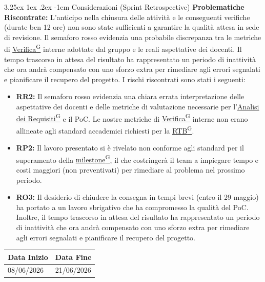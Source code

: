 \documentclass[a4paper,12pt]{article}
\makeatletter
\newcounter{subsubsubsection}[subsubsection]
\renewcommand\paragraph{\@startsection{paragraph}{5}{\z@}%
  {3.25ex \@plus1ex \@minus.2ex}%
  {-1em}%
  {\normalfont\normalsize\bfseries}}
\providecommand{\glslink}[2]{\href{https://alittlebyte-19.github.io/Documentazione/glossario.html\#gls-#1}{\underline{#2}\textsuperscript{\scriptsize G}}}
\makeatother
\begin{document}
\paragraph{Considerazioni (Sprint Retrospective)}
\textbf{Problematiche Riscontrate:} L'anticipo nella chiusura delle attività e le conseguenti verifiche (durate ben 12 ore) non sono state sufficienti a garantire la qualità attesa in sede di revisione. Il semaforo rosso evidenzia una probabile discrepanza tra le metriche di \glslink{verificatore}{Verifica} interne adottate dal gruppo e le reali aspettative dei docenti. Il tempo trascorso in attesa del risultato ha rappresentato un periodo di inattività che ora andrà compensato con uno sforzo extra per rimediare agli errori segnalati e pianificare il recupero del progetto.
I rischi riscontrati sono stati i seguenti:
\begin{itemize}
    \item \textbf{RR2:} Il semaforo rosso evidenzia una chiara errata interpretazione delle aspettative dei docenti e delle metriche di valutazione necessarie per l'\glslink{analisi-dei-requisiti-adr}{Analisi dei Requisiti} e il PoC. Le nostre metriche di \glslink{verificatore}{Verifica} interne non erano allineate agli standard accademici richiesti per la \glslink{rtb-requirements-and-technology-baseline}{RTB}.
    \item \textbf{RP2:} Il lavoro presentato si è rivelato non conforme agli standard per il superamento della \glslink{milestone}{milestone}, il che costringerà il team a impiegare tempo e costi maggiori (non preventivati) per rimediare al problema nel prossimo periodo.
    \item \textbf{RO3:} Il desiderio di chiudere la consegna in tempi brevi (entro il 29 maggio) ha portato a un lavoro sbrigativo che ha compromesso la qualità del PoC. Inoltre, il tempo trascorso in attesa del risultato ha rappresentato un periodo di inattività che ora andrà compensato con uno sforzo extra per rimediare agli errori segnalati e pianificare il recupero del progetto.
\end{itemize}


\label{sec:rtb_sestoperiodo}
\begin{table}[H]
    \centering
    \renewcommand{\arraystretch}{1.5} 
    \begin{tabularx}{\textwidth}{|X|X|}
    \hline \rowcolor{Dandelion!50}
    \textbf{Data Inizio} & \textbf{Data Fine}\\
    \hline
    08/06/2026 & 21/06/2026\\
    \hline

    \end{tabularx}
\end{table}
\end{document}
